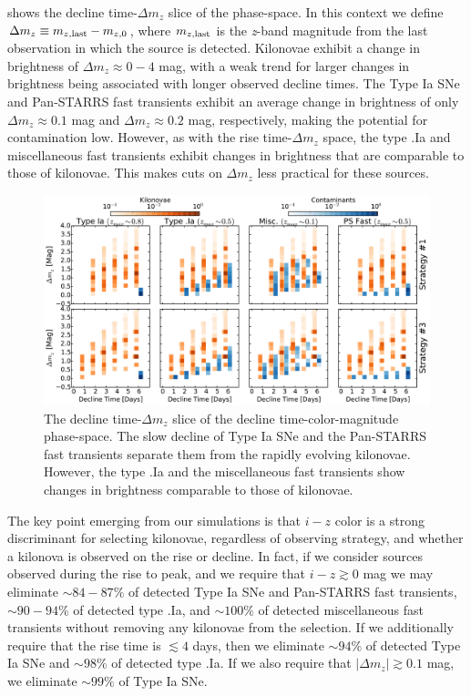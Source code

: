  shows the decline time-$\Delta m_z$ slice of the phase-space. In this context we define $\Delta m_z \equiv m_{z,{\rm last}} - m_{z,{\rm 0}}$, where $m_{z,{\rm last}}$ is the {\em z}-band magnitude from the last observation in which the source is detected. Kilonovae exhibit a change in brightness of $\Delta m_z \approx 0 - 4$ mag, with a weak trend for larger changes in brightness being associated with longer observed decline times. The Type Ia SNe and Pan-STARRS fast transients exhibit an average change in brightness of only $\Delta m_z \approx 0.1$ mag and $\Delta m_z \approx 0.2$ mag, respectively, making the potential for contamination low. However, as with the rise time-$\Delta m_z$ space, the type .Ia and miscellaneous fast transients exhibit changes in brightness that are comparable to those of kilonovae. This makes cuts on $\Delta m_z$ less practical for these sources.  

\begin{figure}[t!]
\centering
\includegraphics[width=\textwidth]{./figs/chapter2/f11.pdf}
\caption{\singlespace The decline time-$\Delta m_z$ slice of the decline time-color-magnitude phase-space. The slow decline of Type Ia SNe and the Pan-STARRS fast transients separate them from the rapidly evolving kilonovae. However, the type .Ia and the miscellaneous fast transients show changes in brightness comparable to those of kilonovae.}
\label{fig:ch2_decdm}
\end{figure}

\clearpage
The key point emerging from our simulations is that $i-z$ color is a strong discriminant for selecting kilonovae, regardless of observing strategy, and whether a kilonova is observed on the rise or decline. In fact, if we consider sources observed during the rise to peak, and we require that $i-z\gtrsim0$ mag we may eliminate $\sim84-87\%$ of detected Type Ia SNe and Pan-STARRS fast transients, $\sim90-94\%$ of detected type .Ia, and $\sim100\%$ of detected miscellaneous fast transients without removing any kilonovae from the selection. If we additionally require that the rise time is $\lesssim4$ days, then we eliminate $\sim94\%$ of detected Type Ia SNe and $\sim98\%$ of detected type .Ia. If we also require that $|\Delta m_z| \gtrsim 0.1$ mag, we eliminate $\sim99\%$ of Type Ia SNe.

